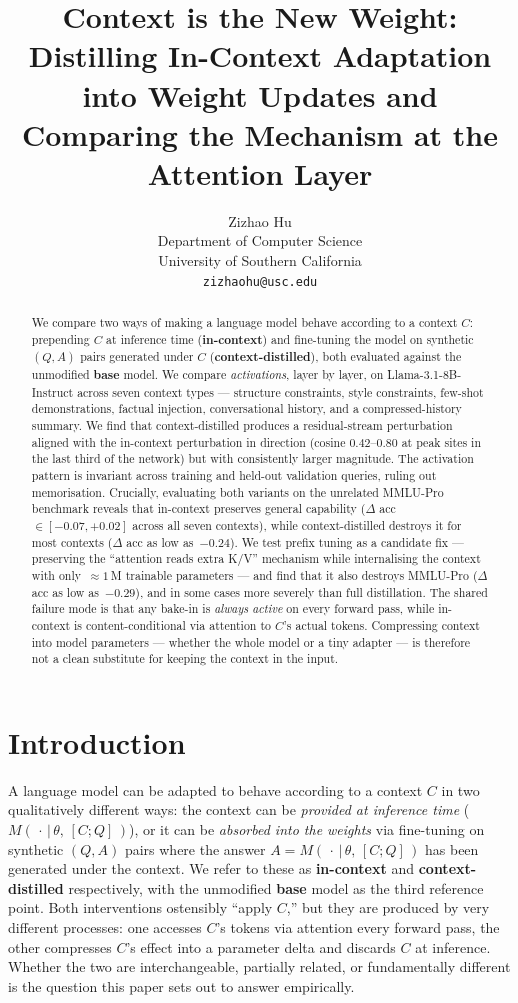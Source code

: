 \documentclass{article}
\title{Context is the New Weight:\\
       Distilling In-Context Adaptation into Weight Updates and\\
       Comparing the Mechanism at the Attention Layer}
\author{%
  Zizhao Hu \\
  Department of Computer Science \\
  University of Southern California \\
  \texttt{zizhaohu@usc.edu} \\
}
\begin{document}
\maketitle

\begin{abstract}
We compare two ways of making a language model behave according to a
context $C$: prepending $C$ at inference time (\textbf{in-context}) and
fine-tuning the model on synthetic $(Q, A)$ pairs generated under $C$
(\textbf{context-distilled}), both evaluated against the unmodified
\textbf{base} model. We compare \emph{activations}, layer by layer, on
Llama-3.1-8B-Instruct across seven context types --- structure
constraints, style constraints, few-shot demonstrations, factual
injection, conversational history, and a compressed-history summary. We
find that context-distilled produces a residual-stream perturbation
aligned with the in-context perturbation in direction (cosine
$0.42$--$0.80$ at peak sites in the last third of the network) but with
consistently larger magnitude. The activation pattern is invariant
across training and held-out validation queries, ruling out
memorisation. Crucially, evaluating both variants on the unrelated MMLU-Pro
benchmark reveals that in-context preserves general capability
($\Delta$ acc $\in [-0.07, +0.02]$ across all seven contexts), while
context-distilled destroys it for most contexts
($\Delta$ acc as low as~$-0.24$). We test prefix tuning as a candidate
fix --- preserving the ``attention reads extra K/V'' mechanism while
internalising the context with only~$\approx 1$\,M trainable
parameters --- and find that it also destroys MMLU-Pro
($\Delta$ acc as low as~$-0.29$), and in some cases more severely
than full distillation. The shared failure mode is that any bake-in
is \emph{always active} on every forward pass, while in-context is
content-conditional via attention to $C$'s actual tokens. Compressing
context into model parameters --- whether the whole model or a tiny
adapter --- is therefore not a clean substitute for keeping the
context in the input.
\end{abstract}

\section{Introduction}
\label{sec:intro}

A language model can be adapted to behave according to a context $C$ in
two qualitatively different ways: the context can be \emph{provided at
inference time} ($M(\,\cdot\,|\,\theta,\, [C; Q]\,)$), or it can be
\emph{absorbed into the weights} via fine-tuning on synthetic $(Q, A)$
pairs where the answer $A = M(\,\cdot\,|\,\theta,\, [C; Q]\,)$ has been
generated under the context. We refer to these as \textbf{in-context}
and \textbf{context-distilled} respectively, with the unmodified
\textbf{base} model as the third reference point. Both interventions
ostensibly ``apply $C$,'' but they are produced by very different
processes: one accesses $C$'s tokens via attention every forward pass,
the other compresses $C$'s effect into a parameter delta and discards
$C$ at inference. Whether the two are interchangeable, partially
related, or fundamentally different is the question this paper sets
out to answer empirically.
\end{document}
